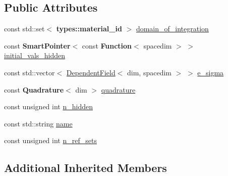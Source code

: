 \subsection*{Public Attributes}
\begin{DoxyCompactItemize}
\item 
const std\+::set$<$ {\bf types\+::material\+\_\+id} $>$ \hyperlink{class_scalar_functional_ae3b6dd6934e1cd55fcc55cf344179407}{domain\+\_\+of\+\_\+integration}
\item 
const {\bf Smart\+Pointer}$<$ const {\bf Function}$<$ spacedim $>$ $>$ \hyperlink{class_scalar_functional_a602d0bc2c945822c6b756fc63183ae2b}{initial\+\_\+vals\+\_\+hidden}
\item 
const std\+::vector$<$ \hyperlink{class_dependent_field}{Dependent\+Field}$<$ dim, spacedim $>$ $>$ \hyperlink{class_scalar_functional_a86662b03a63219227993a2c6c07aefc1}{e\+\_\+sigma}
\item 
const {\bf Quadrature}$<$ dim $>$ \hyperlink{class_scalar_functional_adea9ff214aeb2a1d8c3712a9d2433883}{quadrature}
\item 
const unsigned int \hyperlink{class_scalar_functional_a8b1617930242870f22eef5e306cb717f}{n\+\_\+hidden}
\item 
const std\+::string \hyperlink{class_scalar_functional_a4d184688053b3443d10e228e4a8eba60}{name}
\item 
const unsigned int \hyperlink{class_scalar_functional_a7e12423f4b29e9e0aaa0f7f9c2d1c0eb}{n\+\_\+ref\+\_\+sets}
\end{DoxyCompactItemize}
\subsection*{Additional Inherited Members}


